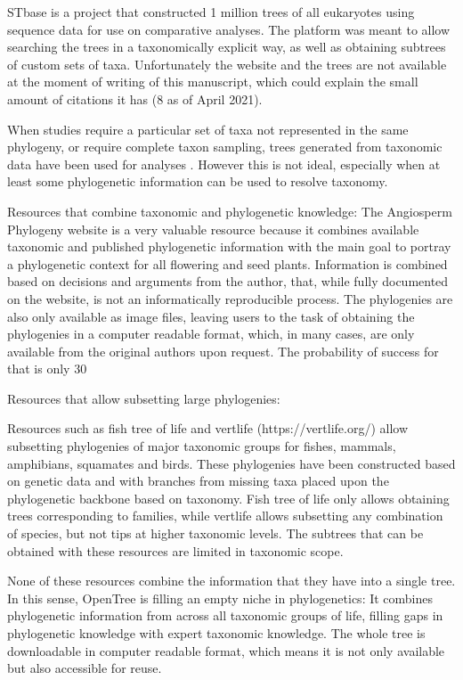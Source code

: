 \documentclass[oupdraft]{sysbio_sse}
\begin{document}
STbase \citep{mcmahon2015stbase} is a project that constructed 1 million trees of
all eukaryotes using sequence data for use on comparative analyses.
The platform was meant to allow searching the
trees in a taxonomically explicit way, as well as obtaining subtrees of custom sets of taxa.
Unfortunately the website and the trees are not available at the moment of writing of
this manuscript, which could explain the small amount of citations it has (8 as of April 2021).

When studies require a particular set of taxa not represented in the same phylogeny,
or require complete taxon sampling, trees generated from taxonomic data have been
used for analyses \citep{tree2014tree}.
 However this is not ideal, especially when at least some phylogenetic information
 can be used to resolve taxonomy.

Resources that combine taxonomic and phylogenetic knowledge:
The Angiosperm Phylogeny website \citep{stevens2001angiosperm} is a very valuable resource because it combines
available taxonomic and published phylogenetic information with the main goal to
portray a phylogenetic context for all flowering and seed plants. Information is
combined based on decisions and arguments from the author, that, while fully documented
on the website, is not an informatically reproducible process. The phylogenies are
also only available as image files, leaving users to the task of obtaining the phylogenies
in a computer readable format, which, in many cases, are only available from the
original authors upon request. The probability of success for that is only 30%

Resources that allow subsetting large phylogenies:

Resources such as fish tree of life \citep{chang2019r} and vertlife (https://vertlife.org/)
allow subsetting phylogenies of major taxonomic groups for fishes, mammals, amphibians, squamates and birds.
These phylogenies have been constructed based on genetic data and with branches
from missing taxa placed upon the phylogenetic backbone based on taxonomy. Fish
tree of life only allows obtaining trees corresponding to families, while vertlife
allows subsetting any combination of species, but not tips at higher taxonomic levels.
The subtrees that can be obtained with these resources are limited in taxonomic scope.

None of these resources combine the information that they have into a single tree.
In this sense, OpenTree is filling an empty niche in phylogenetics:
It combines phylogenetic information from across all taxonomic groups of life,
filling gaps in phylogenetic knowledge with expert taxonomic knowledge. The whole
tree is downloadable in computer readable format, which means it is not only available
but also accessible for reuse.
\end{document}
